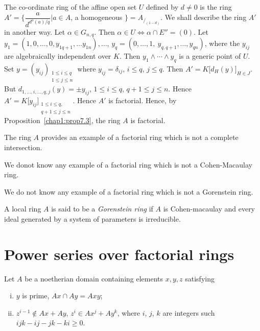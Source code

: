     The co-ordinate ring of the affine open set $U$ defined by $d \neq
    0$ is the ring $A' = \bigg\{\dfrac{a}{d^{d^o (a) /q}}  \big| a
    \in A$, a homogeneous $\bigg\} = A_{/_{(1-d)}}$. We shall describe
    the ring $A'$ in another way. Let $\alpha \in G_{n, q}$. Then
    $\alpha \in U \Leftrightarrow \alpha \cap E'' = (0)$. Let $y_1 =
    (1, 0 , \ldots ,  0, y_{1 q+1}, \ldots y_{1n}), \ldots$, $y_q = (0,
    \ldots , 1, ~ y_{q, q+1}, \ldots , y_{qn})$, where the $y_{ij}$
    are algebraically independent over $K$. Then $y_1 \wedge \cdots
   \wedge y_q$ is a generic point of $U$. Set $y = (y_{ij})_{\substack{1 \le
        i \le q \\ 1 \le j \le n}}$ where $y_{ij} = \delta_{ij}$, $i
   \leq q$, $j \leq q$. Then
    $A' = K \big[d_H (y) \big]_{H \in J}$. But $d_{1, \ldots , i,
      \ldots , q, j} (y) = \pm y_{ij}$, $1 \le i \le q$, $q+1 \le j \le
    n$. Hence $A' = K \big[ y_{ij} \big]_{\substack{1 \le i \le q,
        \\ q+1 \le j \le n}}$. Hence $A'$ is factorial. Hence, by
    Proposition~\ref{chap1:prop7.3}, the ring $A$ is factorial. 
    
\setcounter{rem}{0}
\begin{rem} %
The ring $A$ provides an example of a factorial ring which is not a
complete intersection. 
\end{rem}  
      
\begin{rem} %
We do\pageoriginale not know any example of a factorial ring which is
not a Cohen-Macaulay ring.  
\end{rem}  
      
\begin{rem} %
We do not know any example of a factorial ring which is not a
Gorenstein ring.  
\end{rem}    
    
 A local ring $A$ is said to be a \textit{Gorenstein ring} if $A$ is
 Cohen-macaulay and every ideal generated by a system of parameters is
 irreducible. 
 

\section{Power series over factorial rings}\label{chap1:sec9}%

\begin{theorem}\label{chap1:thm9.1} %
Let $A$ be a noetherian domain containing elements $x, y, z$ satisfying
\begin{enumerate} [(i)]
\item $y$ is prime, $Ax \cap Ay = Axy$;

\item $z^{i - 1} \notin Ax + Ay$, $z^i \in Ax^j + Ay^k$, where
  $i$, $j$, $k$ are integers such $ijk - ij - jk - ki \geq 0$.
\end{enumerate}
\end{theorem}    
    
